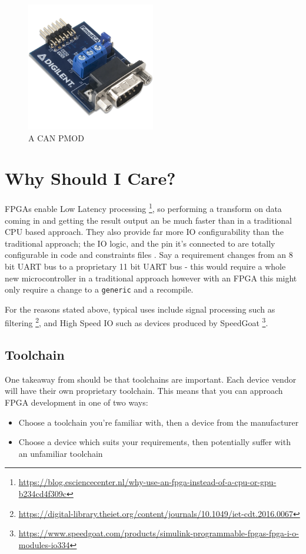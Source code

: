\documentclass[11pt,a4paper]{article}
\newlength\myheight
\newlength\mydepth
\newcommand*\inlinegraphics[1]{%
  \settototalheight\myheight{Xygp}%
  \settodepth\mydepth{Xygp}%
  \raisebox{-\mydepth}{\texttt{[image: \#1]}}%
}
\newcommand{\handwaving}{\inlinegraphics{./src/hand.png}}
\begin{document}
\begin{figure}
    \begin{center}
        \includegraphics[width=0.5\textwidth]{./src/pmod_can.png}
        \caption{A CAN PMOD}
        \label{fig:pmod}
    \end{center}
\end{figure}
\pagebreak
\tableofcontents
\listoffigures
\listoftables
\pagebreak

\setlength{\parskip}{\medskipamount}

\section{Why Should I Care?}
FPGAs enable Low Latency processing \footnote{\url{https://blog.esciencecenter.nl/why-use-an-fpga-instead-of-a-cpu-or-gpu-b234cd4f309c}}, so performing a transform on data coming in and getting the result output an be much faster than in a traditional CPU based approach. They also provide far more IO configurability than the traditional approach; the IO logic, and the pin it's connected to are totally configurable in code and constraints files\handwaving. Say a requirement changes from an 8 bit UART bus to a proprietary 11 bit UART bus - this would require a whole new microcontroller in a traditional approach however with an FPGA this might only require a change to a \texttt{generic} and a recompile. 

For the reasons stated above, typical uses include signal processing such as filtering \footnote{\url{https://digital-library.theiet.org/content/journals/10.1049/iet-cdt.2016.0067}}, and High Speed IO such as devices produced by SpeedGoat \footnote{\url{https://www.speedgoat.com/products/simulink-programmable-fpgas-fpga-i-o-modules-io334}}.
\subsection{Toolchain}
One takeaway from should be that toolchains are important. Each device vendor will have their own proprietary toolchain. This means that you can approach FPGA development in one of two ways:
\begin{itemize}
    \item Choose a toolchain you're familiar with, then a device from the manufacturer
    \item Choose a device which suits your requirements, then potentially suffer with an unfamiliar toolchain
\end{itemize}
\end{document}
